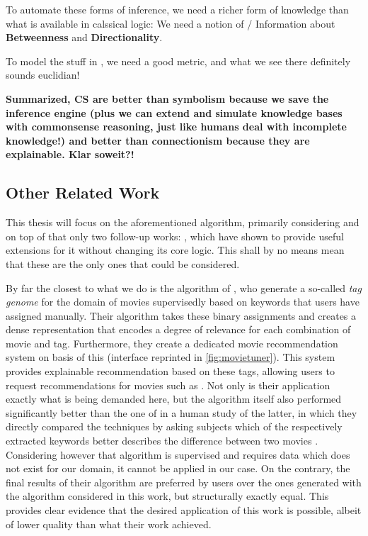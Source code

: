 To automate these forms of inference, we need a richer form of knowledge than what is available in calssical logic: We need a notion of / Information about \textbf{Betweenness} and \textbf{Directionality}.

To model the stuff in \autocite{fig:graphic_reasoning}, we need a good metric, and what we see there definitely sounds euclidian!

\textbf{Summarized, CS are better than symbolism because we save the inference engine (plus we can extend and simulate knowledge bases with commonsense reasoning, just like humans deal with incomplete knowledge!) and better than connectionism because they are explainable. Klar soweit?!}


\subsection{Other Related Work}
\label{sec:otherwork}

This thesis will focus on the aforementioned algorithm, primarily considering \cite{Derrac2015} and on top of that only two follow-up works: \cite{Ager2018, Alshaikh2020}, which have shown to provide useful extensions for it without changing its core logic. This shall by no means mean that these are the only ones that could be considered.

By far the closest to what we do is the algorithm of \textcite{VISR12}, who generate a so-called \textit{tag genome} for the domain of movies supervisedly based on keywords that users have assigned manually. Their algorithm takes these binary assignments and creates a dense representation that encodes a degree of relevance for each combination of movie and tag. Furthermore, they create a dedicated movie recommendation system on basis of this (interface reprinted in \autoref{fig:movietuner}). This system provides explainable recommendation based on these tags, allowing users to request recommendations for movies such as \textit{} \cite[3]{VISR12}. Not only is their application exactly what is being demanded here, but the algorithm itself also performed significantly better than the one of \textcite{Derrac2015} in a human study of the latter, in which they directly compared the techniques by asking subjects which of the respectively extracted keywords better describes the difference between two movies \cite[44]{Derrac2015}. Considering however that  algorithm is supervised and requires data which does not exist for our domain, it cannot be applied in our case. On the contrary, the final results of their algorithm are preferred by users over the ones generated with the algorithm considered in this work, but structurally exactly equal. This provides clear evidence that the desired application of this work is possible, albeit of lower quality than what their work achieved.

